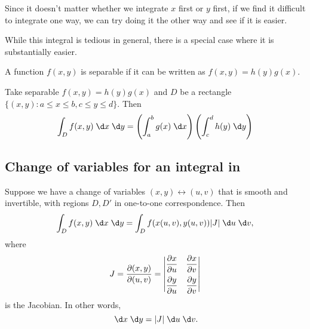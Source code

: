 \documentclass[a4paper]{article}
\begin{document}
Since it doesn't matter whether we integrate $x$ first or $y$ first, if we find it difficult to integrate one way, we can try doing it the other way and see if it is easier.

While this integral is tedious in general, there is a special case where it is substantially easier.
\begin{defi}
  A function $f(x, y)$ is separable if it can be written as $f(x, y) = h(y)g(x)$.
\end{defi}

\begin{prop}
  Take separable $f(x, y) = h(y)g(x)$ and $D$ be a rectangle $\{(x, y): a\leq x\leq b, c\leq y \leq d\}$. Then
  \[
    \int_Df(x, y)\;\d x\;\d y = \left(\int_a^b g(x)\;\d x\right)\left(\int_c^d h(y)\;\d y\right)
  \]
\end{prop}

\subsection{Change of variables for an integral in }
\begin{prop}
  Suppose we have a change of variables $(x, y)\leftrightarrow (u, v)$ that is smooth and invertible, with regions $D, D'$ in one-to-one correspondence. Then
  \[
    \int_D f(x, y)\;\d x\;\d y = \int_D f(x(u, v), y(u, v))|J|\;\d u\;\d v,
  \]
  where
  \[
    J = \frac{\partial (x, y)}{\partial (u, v)} =
    \begin{vmatrix}
      \dfrac{\partial x}{\partial u} & \dfrac{\partial x}{\partial v}\vspace{5pt}\\
      \dfrac{\partial y}{\partial u} & \dfrac{\partial y}{\partial v}\\
    \end{vmatrix}
  \]
  is the Jacobian. In other words,
  \[
    \;\d x\;\d y = |J|\;\d u\;\d v.
  \]
\end{prop}
\end{document}
